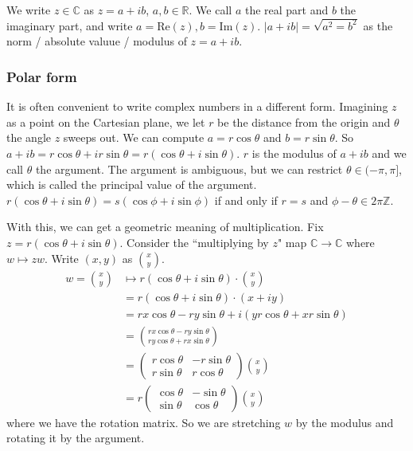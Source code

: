 \documentclass{article}
\theoremstyle{plain}
\theoremstyle{remark}
\newcommand{\Z}{{\mathbb Z}}
\newcommand{\R}{{\mathbb R}}
\newcommand{\C}{{\mathbb C}}
\begin{document}
We write $z \in \C$ as $z = a+ib$, $a,b \in \R$.
We call $a$ the real part and $b$ the imaginary part,
and write $a = \mathrm{Re}(z), b = \mathrm{Im}(z)$.
$|a+ib| = \sqrt{a^2 = b^2}$ as the norm / absolute valuue / modulus of $z = a + ib$.

\subsubsection{Polar form}
It is often convenient to write complex numbers in a different form.
Imagining $z$ as a point on the Cartesian plane,
we let $r$ be the distance from the origin and $\theta$ the angle $z$ sweeps out.
We can compute $a = r\cos\theta$ and $b = r\sin\theta$.
So $a+ib = r\cos\theta + ir\sin\theta = r(\cos\theta + i\sin\theta)$.
$r$ is the modulus of $a + ib$ and we call $\theta$ the argument.
The argument is ambiguous, but we can restrict $\theta \in (-\pi,\pi]$,
which is called the principal value of the argument.
$r(\cos\theta + i\sin\theta) = s(\cos\phi + i\sin\phi)$ if and only if
$r = s$ and $\phi - \theta \in 2\pi\Z$.

With this, we can get a geometric meaning of multiplication.
Fix $z = r(\cos\theta +i \sin\theta)$.
Consider the ``multiplying by $z$" map $\C \to \C$ where $w \mapsto zw$.
Write $(x,y)$ as $\binom{x}{y}$.
\begin{align*}
	w = \binom{x}{y} &\mapsto r(\cos\theta + i\sin\theta)\cdot\binom{x}{y}\\
	&= r(\cos\theta + i\sin\theta)\cdot(x+iy)\\
	&= rx\cos\theta - ry\sin\theta + i(yr\cos\theta + xr\sin\theta)\\
	&= \binom{rx\cos\theta - ry\sin\theta}{ry\cos\theta+rx\sin\theta}\\
	&= \begin{pmatrix} r\cos\theta & -r\sin\theta\\ r\sin\theta & r\cos\theta \end{pmatrix}
	\binom{x}{y}\\
	&= r\begin{pmatrix} \cos\theta & -\sin\theta\\ \sin\theta & \cos\theta \end{pmatrix}
	\binom{x}{y}
\end{align*}
where we have the rotation matrix.
So we are stretching $w$ by the modulus and rotating it by the argument.
\end{document}
